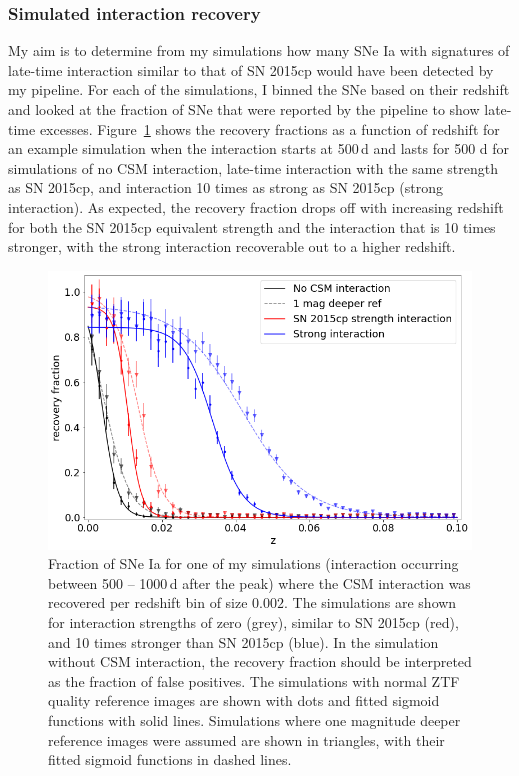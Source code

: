 \documentclass[a4paper,oneside,12pt, class=Latex/Classes/PhDthesisPSnPDF, crop=false]{standalone}
\begin{document}
\subsubsection{Simulated interaction recovery}
\label{simulated_reco}
My aim is to determine from my simulations how many SNe Ia with signatures of late-time interaction similar to that of SN 2015cp would have been detected by my pipeline. For each of the simulations, I binned the SNe based on their redshift and looked at the fraction of SNe that were reported by the pipeline to show late-time excesses. Figure~\ref{recov_fracs} shows the recovery fractions as a function of redshift for an example simulation when the interaction starts at 500\,d and lasts for 500 d for simulations of no CSM interaction, late-time interaction with the same strength as SN 2015cp, and interaction 10 times as strong as SN 2015cp (strong interaction). As expected, the recovery fraction drops off with increasing redshift for both the SN 2015cp equivalent strength and the interaction that is 10 times stronger, with the strong interaction recoverable out to a higher redshift.

\begin{figure}
 \centering
 \includegraphics[width=\textwidth]{../Images/chapter_3/recov_fracs.png}
 \caption[Simulated late-time interaction recovery as a function of redshift.]{Fraction of SNe Ia for one of my simulations (interaction occurring between 500 -- 1000\,d after the peak) where the CSM interaction was recovered per redshift bin of size $0.002$. The simulations are shown for interaction strengths of zero (grey), similar to SN 2015cp (red), and 10 times stronger than SN 2015cp (blue). In the simulation without CSM interaction, the recovery fraction should be interpreted as the fraction of false positives. The simulations with normal ZTF quality reference images are shown with dots and fitted sigmoid functions with solid lines. Simulations where one magnitude deeper reference images were assumed are shown in triangles, with their fitted sigmoid functions in dashed lines.}
 \label{recov_fracs}
\end{figure}
\end{document}
